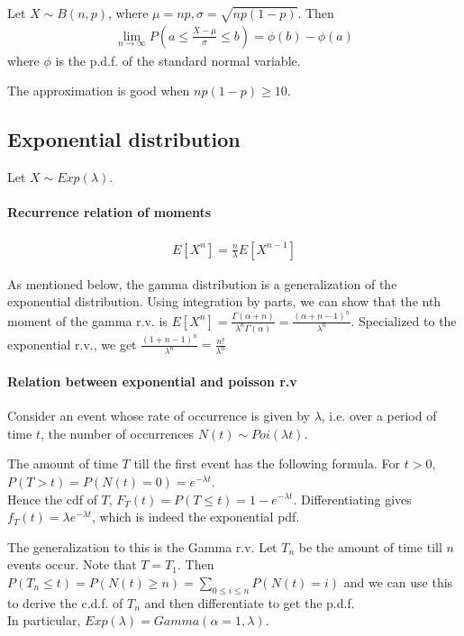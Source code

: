 \documentclass{article}
\begin{document}
Let $X\sim B(n, p)$, where $\mu = np, \sigma = \sqrt{np(1-p)}$. Then
\begin{align*}
	\lim_{n\rightarrow \infty}P(a \leq \frac{X-\mu}{\sigma} \leq b) = \phi(b) - \phi(a)
\end{align*}
where $\phi$ is the p.d.f. of the standard normal variable.

The approximation is good when $np(1-p)\geq 10$.

\subsection{Exponential distribution}
Let $X\sim Exp(\lambda)$.
\paragraph{Recurrence relation of moments}
\begin{align*}
	E[X^n] = \frac{n}{\lambda}E[X^{n-1}]
\end{align*}

As mentioned below, the gamma distribution is a generalization of the exponential distribution. Using integration by parts, we can show that the nth moment of the gamma r.v. is $E[X^n] = \frac{\Gamma(\alpha + n)}{\lambda^n \Gamma(\alpha)} = \frac{(\alpha + n - 1)^{\underline{n}}}{\lambda^n}$. Specialized to the exponential r.v., we get $\frac{(1+n-1)^{\underline{n}}}{\lambda^n} = \frac{n!}{\lambda^n}$

\paragraph{Relation between exponential and poisson r.v}
Consider an event whose rate of occurrence is given by $\lambda$, i.e. over a period of time $t$, the number of occurrences $N(t)\sim Poi(\lambda t)$.

The amount of time $T$ till the first event has the following formula. For $t > 0$, $P(T > t) = P(N(t) = 0) = e^{-\lambda t}$.\\
Hence the cdf of $T$, $F_T(t) = P(T\leq t) = 1-e^{-\lambda t}$. Differentiating gives $f_T(t) = \lambda e^{-\lambda t}$, which is indeed the exponential pdf.

The generalization to this is the Gamma r.v. Let $T_n$ be the amount of time till $n$ events occur. Note that $T = T_1$. Then $P(T_n\leq t) = P(N(t)\geq n) = \sum_{0\leq i\leq n}P(N(t) = i)$ and we can use this to derive the c.d.f. of $T_n$ and then differentiate to get the p.d.f.\\
In particular, $Exp(\lambda) = Gamma(\alpha = 1, \lambda)$.
\end{document}
